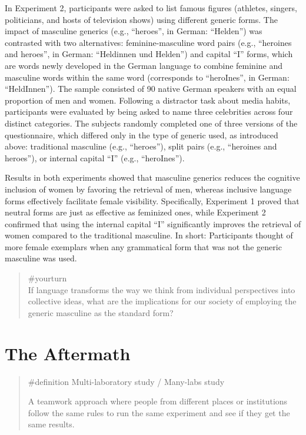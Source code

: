 \documentclass[
  letterpaper,
]{book}
\begin{document}
In Experiment 2, participants were asked to list famous figures
(athletes, singers, politicians, and hosts of television shows) using
different generic forms. The impact of masculine generics (e.g.,
``heroes'', in German: ``Helden'') was contrasted with two alternatives:
feminine-masculine word pairs (e.g., ``heroines and heroes'', in German:
``Heldinnen und Helden'') and capital ``I'' forms, which are words newly
developed in the German language to combine feminine and masculine words
within the same word (corresponds to ``heroInes'', in German:
``HeldInnen''). The sample consisted of 90 native German speakers with
an equal proportion of men and women. Following a distractor task about
media habits, participants were evaluated by being asked to name three
celebrities across four distinct categories. The subjects randomly
completed one of three versions of the questionnaire, which differed
only in the type of generic used, as introduced above: traditional
masculine (e.g., ``heroes''), split pairs (e.g., ``heroines and
heroes''), or internal capital ``I'' (e.g., ``heroInes'').

Results in both experiments showed that masculine generics reduces the
cognitive inclusion of women by favoring the retrieval of men, whereas
inclusive language forms effectively facilitate female visibility.
Specifically, Experiment 1 proved that neutral forms are just as
effective as feminized ones, while Experiment 2 confirmed that using the
internal capital ``I'' significantly improves the retrieval of women
compared to the traditional masculine. In short: Participants thought of
more female exemplars when any grammatical form that was not the generic
masculine was used.

\begin{quote}
{\#yourturn}\\
If language transforms the way we think from individual perspectives
into collective ideas, what are the implications for our society of
employing the generic masculine as the standard form?
\end{quote}

\section{The Aftermath}\label{the-aftermath-15}

\begin{quote}
\label{def-multilaboratory}{\#definition}
Multi-laboratory study / Many-labs study

A teamwork approach where people from different places or institutions
follow the same rules to run the same experiment and see if they get the
same results.
\end{quote}
\end{document}
